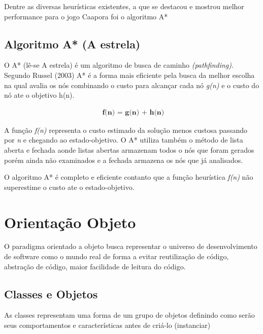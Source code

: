Dentre as diversas heurísticas existentes, a que se destacou e mostrou melhor performance para o jogo Caapora foi o algoritmo A*
	

\subsection{Algoritmo A* (A estrela)}	
O A* (lê-se A estrela) é um algoritmo de busca de caminho \textit{(pathfinding)}. Segundo Russel (2003) A* é a forma mais eficiente pela busca da melhor escolha na qual avalia os nós combinando o custo para alcançar cada nó \textit{g(n)} e o custo do nó ate o objetivo h(n).

	\begin{equation}
		\begin{aligned}
		\textbf{ f(n) = g(n) + h(n)} 
		\end{aligned}
	\end{equation}
 
A função \textit{f(n)} representa o custo estimado da solução menos custosa passando por \textit{n} e chegando ao estado-objetivo. O A* utiliza também o método de lista aberta e fechada aonde listas abertas armazenam todos o nós que foram gerados porém ainda não examinados e a fechada armazena os nós que já analisados.

O algoritmo A* é completo e eficiente contanto que a função heurística \textit{f(n)} não superestime o custo ate o estado-objetivo.

\section{Orientação Objeto}
\label{sec:orientação-objeto}	

O paradigma orientado a objeto busca representar o universo de desenvolvimento de software como o mundo real de forma a evitar reutilização de código, abstração de código, maior facilidade de leitura do código.

\subsection{Classes e Objetos}	
As classes representam uma forma de um grupo de objetos definindo como serão seus comportamentos e características antes de criá-lo (instanciar)


